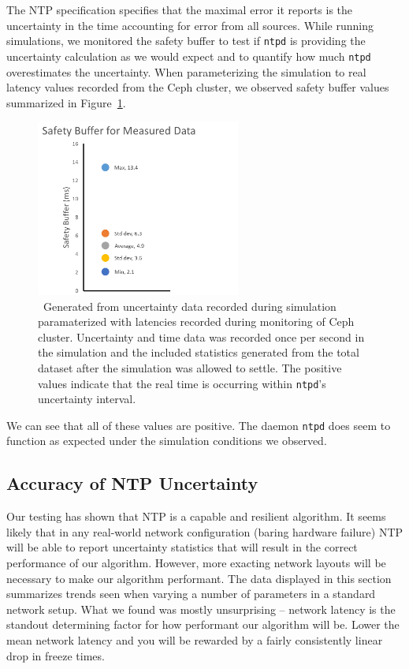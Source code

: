 The NTP specification specifies that the maximal error it reports is the 
uncertainty in the time accounting for error from all sources.
While running simulations, we monitored the safety buffer to test if 
\texttt{ntpd} is providing the uncertainty calculation as we would expect
and to quantify how much \texttt{ntpd} overestimates the uncertainty.
When parameterizing the simulation to real latency values recorded from the 
Ceph cluster, we observed safety buffer values summarized in 
Figure~\ref{fig:safety-data}.

\begin{figure}[!htbp]
  \caption{~Generated from uncertainty data recorded during simulation paramaterized
  with latencies recorded during monitoring of Ceph cluster. Uncertainty and time
  data was recorded once per second in the simulation and the included statistics 
  generated from the total dataset after the simulation was allowed to settle. 
  The positive values indicate that the real time is occurring within \texttt{ntpd}'s 
  uncertainty interval.}
  \label{fig:safety-data}
  \centering
  \includegraphics[width=0.6\textwidth]{5pointsSafety.png}
\end{figure}

We can see that all of these values are positive. The daemon \texttt{ntpd} 
does seem to function as expected under the simulation conditions we observed. 

\subsection{Accuracy of NTP Uncertainty}

Our testing has shown that NTP is a capable and resilient
algorithm. It seems likely that in any real-world network
configuration (baring hardware failure) NTP will be able to report
uncertainty statistics that will result in the correct performance of our
algorithm. However, more exacting network layouts will be necessary to
make our algorithm performant. The data displayed in this section
summarizes trends seen when varying a number of parameters in a
standard network setup. What we found was mostly unsurprising -- network 
latency is the standout determining factor for how performant
our algorithm will be. Lower the mean network latency and you will be
rewarded by a fairly consistently linear drop in freeze times.

